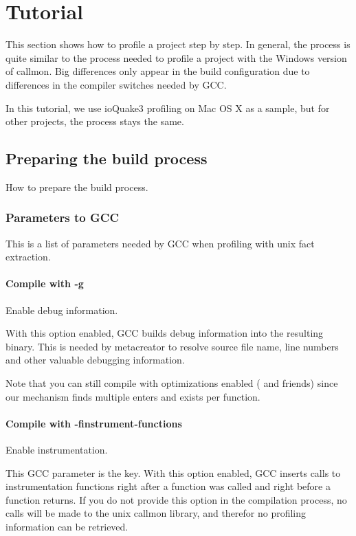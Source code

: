 
\section{Tutorial}
\label{sec:Tutorial}

This section shows how to profile a project step by step. In general, the process is quite similar to the process needed to profile a project with the Windows version of callmon. Big differences only appear in the build configuration due to differences in the compiler switches needed by GCC.

In this tutorial, we use ioQuake3 profiling on Mac OS X as a sample, but for other projects, the process stays the same.

\subsection{Preparing the build process} How to prepare the build process.

\subsubsection{Parameters to GCC} This is a list of parameters needed by GCC when profiling with unix fact extraction.

\paragraph{Compile with -g} Enable debug information.

With this option enabled, GCC builds debug information into the resulting binary. This is needed by metacreator to resolve source file name, line numbers and other valuable debugging information.

Note that you can still compile with optimizations enabled ( and friends) since our mechanism finds multiple enters and exists per function.

\paragraph{Compile with -finstrument-functions} Enable instrumentation.

This GCC parameter is the key. With this option enabled, GCC inserts calls to instrumentation functions right after a function was called and right before a function returns. If you do not provide this option in the compilation process, no calls will be made to the unix callmon library, and therefor no profiling information can be retrieved.

